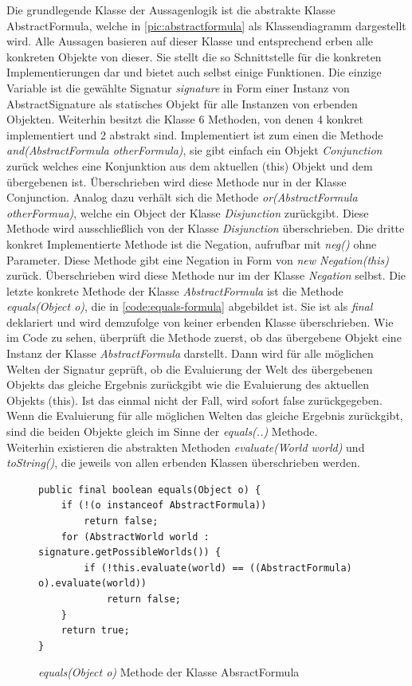 \documentclass[12pt,a4paper]{article}
\begin{document}
Die grundlegende Klasse der Aussagenlogik ist die abstrakte Klasse AbstractFormula, welche in \autoref{pic:abstractformula} als Klassendiagramm dargestellt wird. Alle Aussagen basieren auf dieser Klasse und entsprechend erben alle konkreten Objekte von dieser. Sie stellt die so Schnittstelle für die konkreten Implementierungen dar und bietet auch selbst einige Funktionen. Die einzige Variable ist die gewählte Signatur \textit{signature} in Form einer Instanz von AbstractSignature als statisches Objekt für alle Instanzen von erbenden Objekten. Weiterhin besitzt die Klasse 6 Methoden, von denen 4 konkret implementiert und 2 abstrakt sind. Implementiert ist zum einen die Methode \textit{and(AbstractFormula otherFormula)}, sie gibt einfach ein Objekt \textit{Conjunction} zurück welches eine Konjunktion aus dem aktuellen (this) Objekt und dem übergebenen ist. Überschrieben wird diese Methode nur in der Klasse Conjunction. Analog dazu verhält sich die Methode \textit{or(AbstractFormula otherFormua)}, welche ein Object der Klasse \textit{Disjunction} zurückgibt. Diese Methode wird ausschließlich von der Klasse \textit{Disjunction} überschrieben. Die dritte konkret Implementierte Methode ist die Negation, aufrufbar mit \textit{neg()} ohne Parameter. Diese Methode gibt eine Negation in Form von \textit{new Negation(this)} zurück. Überschrieben wird diese Methode nur im der Klasse \textit{Negation} selbst. Die letzte konkrete Methode der Klasse \textit{AbstractFormula} ist die Methode \textit{equals(Object o)}, die in \autoref{code:equals-formula} abgebildet ist. Sie ist als \textit{final} deklariert und wird demzufolge von keiner erbenden Klasse überschrieben. Wie im Code zu sehen, überprüft die Methode zuerst, ob das übergebene Objekt eine Instanz der Klasse \textit{AbstractFormula} darstellt. Dann wird für alle möglichen Welten der Signatur geprüft, ob die Evaluierung der Welt des übergebenen Objekts das gleiche Ergebnis zurückgibt wie die Evaluierung des aktuellen Objekts (this). Ist das einmal nicht der Fall, wird sofort false zurückgegeben. Wenn die Evaluierung für alle möglichen Welten das gleiche Ergebnis zurückgibt, sind die beiden Objekte gleich im Sinne der \textit{equals(..)} Methode. \\
Weiterhin existieren die abstrakten Methoden \textit{evaluate(World world)} und \textit{toString()}, die jeweils von allen erbenden Klassen überschrieben werden.


\begin{figure}
\begin{lstlisting}
public final boolean equals(Object o) {
    if (!(o instanceof AbstractFormula))
        return false;
    for (AbstractWorld world : signature.getPossibleWorlds()) {
        if (!this.evaluate(world) == ((AbstractFormula) o).evaluate(world))
            return false;
    }
    return true;
}
\end{lstlisting}
\caption{\textit{equals(Object o)} Methode der Klasse AbsractFormula}
\label{code:equals-formula}
\end{figure} 
\end{document}

